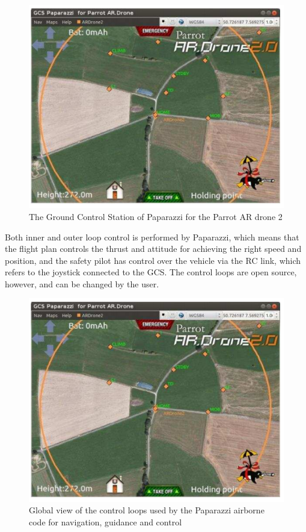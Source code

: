 \begin{figure}
\centering	
\includegraphics[scale=0.4]{img/papgcs}	
\caption{The Ground Control Station of Paparazzi for the Parrot AR drone 2}
\end{figure}

Both inner and outer loop control is performed by Paparazzi, which means that the flight plan controls the thrust and attitude for achieving the right speed and position, and the safety pilot has control over the vehicle via the RC link, which refers to the joystick connected to the GCS. The control loops are open source, however, and can be changed by the user.

\begin{figure}
\centering	
\includegraphics[scale=0.4]{img/papgcs}	
\caption{Global view of the control loops used by the Paparazzi airborne code for navigation, guidance and control}
\end{figure}

